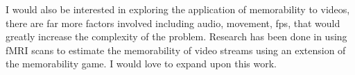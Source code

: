 \documentclass{UoYCSproject}
\begin{document}
I would also be interested in exploring the application of memorability to videos, there are far more factors involved including audio, movement, fps, that would greatly increase the complexity of the problem. Research has been done in \cite{HASSON2004, HASSONNeurocinematics, HASSON2008, fMRIPredictions} using fMRI scans to estimate the memorability of video streams using an extension of the memorability game. I would love to expand upon this work.






\end{document}
